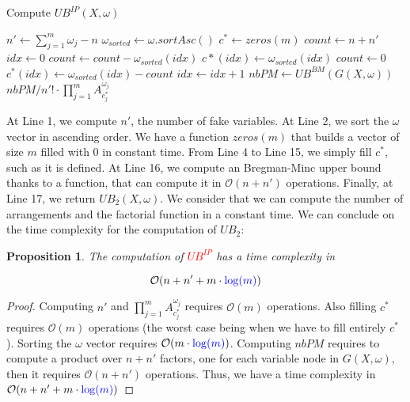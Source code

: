 \documentclass[jair,twoside,11pt,theapa]{article}
\newtheorem{proposition}[theorem]{Proposition}
\newcommand{\major}[1]{\textcolor{red}{#1}}
\newcommand{\minor}[1]{\textcolor{blue}{#1}}
\begin{document}
\begin{algorithm}
\caption{Compute $UB^{IP}(X, \omega)$}
\begin{algorithmic}[1]
\STATE $n' \gets \sum_{j=1}^m \omega_j - n$
\STATE $\omega_{sorted} \gets \omega.sortAsc()$
\STATE $c^* \gets zeros(m)$
\STATE $count \gets n+n'$
\STATE $idx \gets 0$
    	\STATE $count \gets count - \omega_{sorted}(idx)$
        \STATE $c*(idx) \gets \omega_{sorted}(idx)$
    \ELSE
    	\STATE $count \gets 0$
        \STATE $c^*(idx) \gets \omega_{sorted}(idx) - count$
    \ENDIF
    \STATE $idx \gets idx + 1$
\ENDWHILE
\STATE $nbPM \gets UB^{BM}(G(X, \omega))$
\RETURN $nbPM / n'! \cdot \prod_{j=1}^m A_{c^*_j}^{\omega_j}$
\end{algorithmic}
\label{ComputeUB2}
\end{algorithm}

At Line 1, we compute $n'$, the number of fake variables. At Line 2, we sort the $\omega$ vector in ascending order. We have a function $zeros(m)$ that builds a vector of size $m$ filled with $0$ in constant time. From Line 4 to Line 15, we simply fill $c^*$, such as it is defined. At Line 16, we compute an Bregman-Minc upper bound thanks to a function, that can compute it in $\mathcal{O}(n+n')$ operations. Finally, at Line 17, we return $UB_2(X, \omega)$. We consider that we can compute the number of arrangements and the factorial function in a constant time. We can conclude on the time complexity for the computation of $UB_2$:

\begin{proposition}
The computation of \major{$UB^{IP}$} has a time complexity in 

\begin{equation*}
\mathcal{O}(n+n'+m\cdot \minor{\log(m)})
\end{equation*}

\end{proposition}

\begin{proof}
Computing $n'$ and $\prod_{j=1}^m A_{c^*_j}^{\omega_j}$ requires $\mathcal{O}(m)$ operations. Also filling $c^*$ requires $\mathcal{O}(m)$ operations (the worst case being when we have to fill entirely $c^*$). Sorting the $\omega$ vector requires $\mathcal{O}(m\cdot \minor{\log(m)})$. Computing $nbPM$ requires to compute a product over $n+n'$ factors, one for each variable node in $G(X, \omega)$, then it requires $\mathcal{O}(n+n')$ operations.
Thus, we have a time complexity in $\mathcal{O}(n+n'+m \cdot \minor{\log(m)})$
\end{proof}
\end{document}
